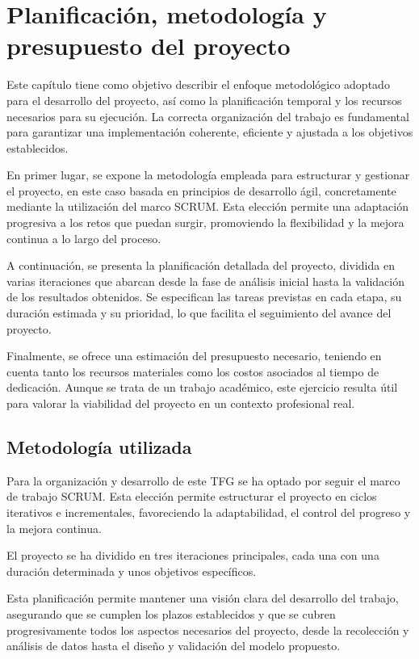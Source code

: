 \chapter{Planificación, metodología y presupuesto del proyecto}

Este capítulo tiene como objetivo describir el enfoque metodológico adoptado para el desarrollo del proyecto, así como la planificación temporal y los recursos necesarios para su ejecución. La correcta organización del trabajo es fundamental para garantizar una implementación coherente, eficiente y ajustada a los objetivos establecidos.

En primer lugar, se expone la metodología empleada para estructurar y gestionar el proyecto, en este caso basada en principios de desarrollo ágil, concretamente mediante la utilización del marco SCRUM. Esta elección permite una adaptación progresiva a los retos que puedan surgir, promoviendo la flexibilidad y la mejora continua a lo largo del proceso.

A continuación, se presenta la planificación detallada del proyecto, dividida en varias iteraciones que abarcan desde la fase de análisis inicial hasta la validación de los resultados obtenidos. Se especifican las tareas previstas en cada etapa, su duración estimada y su prioridad, lo que facilita el seguimiento del avance del proyecto.

Finalmente, se ofrece una estimación del presupuesto necesario, teniendo en cuenta tanto los recursos materiales como los costos asociados al tiempo de dedicación. Aunque se trata de un trabajo académico, este ejercicio resulta útil para valorar la viabilidad del proyecto en un contexto profesional real.

\section{Metodología utilizada}
Para la organización y desarrollo de este TFG se ha optado por seguir el marco de trabajo SCRUM. Esta elección permite estructurar el proyecto en ciclos iterativos e incrementales, favoreciendo la adaptabilidad, el control del progreso y la mejora continua.

El proyecto se ha dividido en tres iteraciones principales, cada una con una duración determinada y unos objetivos específicos. 

Esta planificación permite mantener una visión clara del desarrollo del trabajo, asegurando que se cumplen los plazos establecidos y que se cubren progresivamente todos los aspectos necesarios del proyecto, desde la recolección y análisis de datos hasta el diseño y validación del modelo propuesto.

